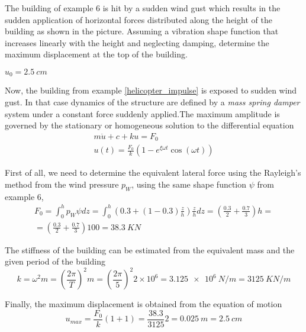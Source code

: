 
\begin{Exercise}[label={wind_gust_impulse}]
The building of example 6 is hit by a sudden wind gust which results in the sudden application of horizontal forces distributed along the height of the building as shown in the picture. Assuming a vibration shape function that increases linearly with the height and neglecting damping, determine the maximum displacement at the top of the building.

\begin{center}
\end{center}

\shortAnswer $u_0 = \qty{2.5}{cm}$
\end{Exercise}



\begin{Answer}[ref={wind_gust_impulse}]
Now, the building from example \ref{helicopter_impulse} is exposed to sudden wind gust. In that case dynamics of the  structure are defined by a \emph{mass spring damper} system under a constant force suddenly applied.The maximum amplitude is governed by the stationary or homogeneous solution to the differential equation
\begin{align*}
m\ddot{u} + c + ku = F_0 \\
u(t) = \frac{F_0}{k}(1 -e^{\xi\omega t}\cos(\omega t))
\end{align*}

First of all, we need to determine the equivalent lateral force using the Rayleigh's method from the wind pressure $p_W$, using the same shape function $\psi$ from example 6,
\begin{align*}
F_0 = \int_0^h p_W\psi dz = \int_0^h \left(0.3 + (1-0.3)\frac{z}{h}\right)\frac{z}{h}dz = \left(\frac{0.3}{2} + \frac{0.7}{3}\right)h = \\
= \left(\frac{0.3}{2} + \frac{0.7}{3}\right)100 = \SI{38.3}{KN}
\end{align*}

The stiffness of the building can be estimated from the equivalent mass and the given period of the building
$$
k = \omega^2m = \left(\frac{2\pi}{T}\right)^2m = \left(\frac{2\pi}{5}\right)^2 2\times 10^6 = \SI{3.125e6}{N/m} = \SI{3125}{KN/m}
$$

Finally, the maximum displacement is obtained from the equation of motion
$$
u_{max} = \frac{F_0}{k}(1+1) = \frac{38.3}{3125}2 = \SI{0.025}{m} = \SI{2.5}{cm}
$$
\end{Answer}
